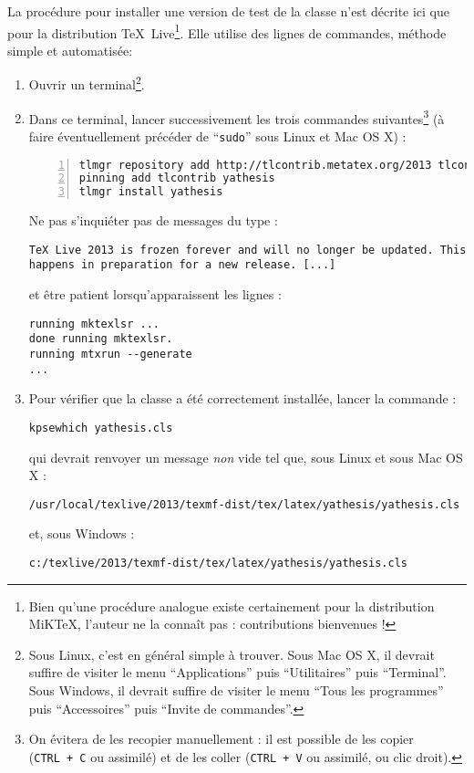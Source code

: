 La procédure pour installer une version de test de la classe n'est décrite ici
que pour la distribution \TeX~Live\footnote{Bien qu'une procédure analogue
  existe certainement pour la distribution MiK\TeX{}, l'auteur ne la connaît
  pas : contributions bienvenues !}. Elle utilise des lignes de commandes,
méthode simple et automatisée:
  \begin{enumerate}
  \item Ouvrir un terminal\footnote{Sous Linux, c'est en général simple
      à trouver. Sous Mac OS X, il devrait suffire de visiter le menu
      \enquote{Applications} puis \enquote{Utilitaires} puis
      \enquote{Terminal}. Sous Windows, il devrait suffire de visiter le menu
      \enquote{Tous les programmes} puis \enquote{Accessoires} puis
      \enquote{Invite de commandes}.}.
  \item Dans ce terminal, lancer successivement les trois commandes
    suivantes\footnote{On évitera de les recopier manuellement : il est
      possible de les copier (\texttt{CTRL~+~C} ou assimilé) et de les coller
      (\texttt{CTRL~+~V} ou assimilé, ou clic droit).} (à faire éventuellement
    précéder de \enquote{\protect\lstinline|sudo|} sous Linux et Mac OS X) :
\begin{lstlisting}[numbers=left]
tlmgr repository add http://tlcontrib.metatex.org/2013 tlcontrib tlmgr
pinning add tlcontrib yathesis
tlmgr install yathesis
\end{lstlisting}
    Ne pas s'inquiéter pas de messages du type :
\begin{lstlisting}
TeX Live 2013 is frozen forever and will no longer be updated. This
happens in preparation for a new release. [...]
\end{lstlisting}
    et être patient lorsqu'apparaissent les lignes :
\begin{lstlisting}
running mktexlsr ...
done running mktexlsr.
running mtxrun --generate
...
\end{lstlisting}
\item Pour vérifier que la classe a été correctement installée, lancer la
  commande :
\begin{lstlisting}
kpsewhich yathesis.cls
\end{lstlisting}
    qui devrait renvoyer un message \emph{non} vide tel que, sous Linux et sous
    Mac OS X :
\begin{lstlisting}
/usr/local/texlive/2013/texmf-dist/tex/latex/yathesis/yathesis.cls
\end{lstlisting}
    et, sous Windows :
\begin{lstlisting}
c:/texlive/2013/texmf-dist/tex/latex/yathesis/yathesis.cls
\end{lstlisting}
  \end{enumerate}
